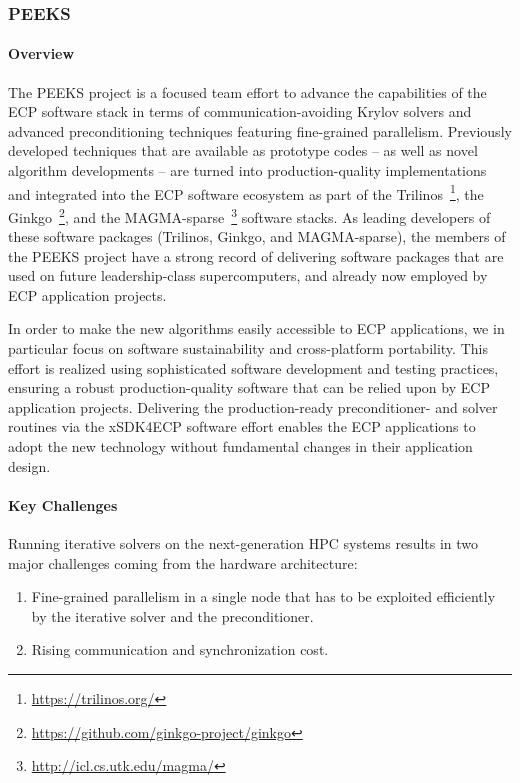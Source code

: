 \subsubsection{ PEEKS} 
\paragraph{Overview} 
The PEEKS project is a focused team effort to advance the capabilities of the
ECP software stack in terms of communication-avoiding Krylov solvers and
advanced preconditioning techniques featuring fine-grained parallelism.
Previously developed techniques that are available as prototype codes -- as
well as novel algorithm developments -- are turned into production-quality 
implementations and integrated into the ECP software ecosystem 
as part of the Trilinos~\footnote{\url{https://trilinos.org/}}, the 
Ginkgo~\footnote{\url{https://github.com/ginkgo-project/ginkgo}}, and the 
MAGMA-sparse~\footnote{\url{http://icl.cs.utk.edu/magma/}} software stacks.
As leading developers of these software packages (Trilinos, Ginkgo, and 
MAGMA-sparse), the members of the PEEKS project have a strong record of 
delivering software packages that are used on future leadership-class 
supercomputers, and already now employed by ECP application projects.

In order to make the new algorithms easily accessible to ECP applications, we
in particular focus on software sustainability and cross-platform portability.
This effort is realized using sophisticated software development
and testing practices, ensuring a robust production-quality software that can
be relied upon by ECP application projects.
Delivering the production-ready preconditioner- and solver routines
via the xSDK4ECP software effort enables the ECP applications to adopt the new
technology without fundamental changes in their application design.

\paragraph{Key  Challenges}
Running iterative solvers on the next-generation HPC systems results in two 
major challenges coming from the hardware architecture:
\begin{enumerate}
\item 
Fine-grained parallelism in a single node that has to be exploited efficiently 
by the iterative solver and the preconditioner.
\item
Rising communication and synchronization cost.
\end{enumerate}

